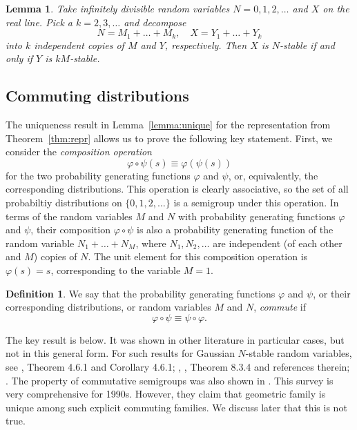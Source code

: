 \documentclass[12pt]{amsart}
\newtheorem{lemma}{Lemma}[section]
\theoremstyle{remark}
\theoremstyle{definition}
\newtheorem{definition}{Definition}[section]
\begin{document}
\begin{lemma} Take infinitely divisible random variables $N = 0, 1, 2, \ldots$ and $X$ on the real line. Pick a $k = 2, 3, \ldots$ and decompose 
$$
N = M_1 + \ldots + M_k,\quad X = Y_1 + \ldots + Y_k
$$
into $k$ independent copies of $M$ and $Y$, respectively. Then $X$ is $N$-stable if and only if $Y$ is $kM$-stable. 
\label{lemma:inf-div}
\end{lemma}

\subsection{Commuting distributions} The uniqueness result in Lemma~\ref{lemma:unique} for the representation from Theorem~\ref{thm:repr} allows us to prove the following key statement. First, we consider the {\it composition operation} 
\begin{equation}
\label{eq:commute}
\varphi\circ \psi(s) \equiv \varphi(\psi(s))
\end{equation}
for the two probability generating functions $\varphi$ and $\psi$, or, equivalently, the corresponding distributions. This operation is clearly associative, so the set of all probabiltiy distributions on $\{0, 1, 2, \ldots\}$ is a semigroup under this operation. In terms of the random variables $M$ and $N$ with probability generating functions $\varphi$ and $\psi$, their composition $\varphi\circ\psi$ is also a probability generating function of the random variable $N_1 + \ldots + N_M$, where $N_1, N_2, \ldots$ are independent (of each other and $M$) copies of $N$. The unit element for this composition operation is $\varphi(s) = s$, corresponding to the variable $M = 1$. 

\begin{definition}
We say that the probability generating functions $\varphi$ and $\psi$, or their corresponding distributions, or random variables $M$ and $N$, {\it commute} if 
\begin{equation}
\label{eq:commuting-equation}
\varphi\circ\psi \equiv \psi\circ\varphi.
\end{equation}
\end{definition}

The key result is below. It was shown in other literature in particular cases, but not in this general form. For such results for Gaussian $N$-stable random variables, see \cite[Chapter 4]{GnedenkoBook}, Theorem 4.6.1 and Corollary 4.6.1; \cite[Theorem 1]{Klebanov}, \cite[Chapter 8]{KKRbook}, Theorem 8.3.4 and references therein; \cite[Theorem 2.1]{Melamed}. The property of commutative semigroups was also shown in \cite[Remark 2.4]{Koz1}. This survey \cite{Koz1} is very comprehensive for 1990s. However, they claim that geometric family is unique among such explicit commuting families. We discuss later that this is not true.  
\end{document}
